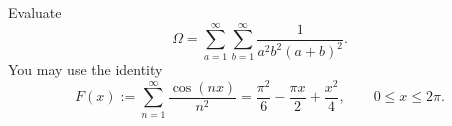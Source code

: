 Evaluate
\[\Omega=\sum_{a=1}^{\infty}\sum_{b=1}^{\infty}\dfrac{1}{a^2b^2(a+b)^2}.\]
You may use the identity
\[F(x):=\sum_{n=1}^{\infty}\dfrac{\cos(nx)}{n^2}
=\dfrac{\pi^2}{6}-\dfrac{\pi x}{2}+\dfrac{x^2}{4},
\qquad 0\le x\le2\pi.\]
